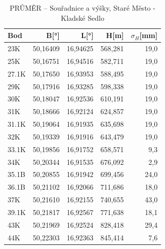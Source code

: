 \begin{table}[H]
\centering
\caption{PRŮMĚR – Souřadnice a výšky, Staré Město - Kladské Sedlo}
\begin{tabular}{l|rrrr}
\hline
Bod & B[°] & L[°] & H[m] & $\sigma_H$[mm] \\
\hline
  23K & 50,16409 & 16,94625 & 568,281 & 19,0 \\
  25K & 50,16751 & 16,94516 & 582,711 & 19,0 \\
27.1K & 50,17650 & 16,93953 & 588,495 & 19,0 \\
  29K & 50,17916 & 16,93285 & 598,338 & 19,0 \\
  30K & 50,18047 & 16,92536 & 610,191 & 19,0 \\
  31K & 50,18666 & 16,92124 & 624,857 & 19,0 \\
31.1K & 50,19064 & 16,91935 & 635,698 & 19,0 \\
  32K & 50,19339 & 16,91916 & 643,479 & 19,0 \\
33.1K & 50,19856 & 16,91752 & 658,571 &  9,3 \\
  34K & 50,20344 & 16,91535 & 676,092 &  2,9 \\
35.1B & 50,20855 & 16,91942 & 699,456 & 24,0 \\
36.1B & 50,21102 & 16,92066 & 711,686 & 18,0 \\
  37K & 50,21610 & 16,92155 & 740,655 & 43,0 \\
39.1K & 50,21817 & 16,92567 & 771,638 & 18,1 \\
  43K & 50,21969 & 16,92524 & 828,418 & 29,4 \\
  44K & 50,22303 & 16,92363 & 845,414 &  7,6 \\
\hline
\end{tabular}
\end{table}

